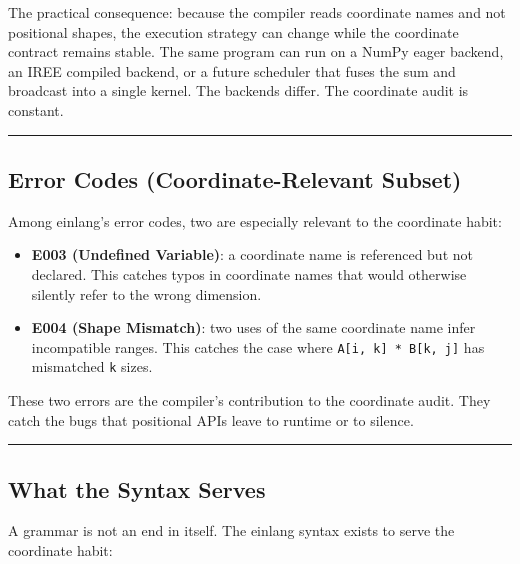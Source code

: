 \documentclass[11pt,]{article}
\providecommand{\tightlist}{%
  \setlength{\itemsep}{0pt}\setlength{\parskip}{0pt}}
\begin{document}
The practical consequence: because the compiler reads coordinate names
and not positional shapes, the execution strategy can change while the
coordinate contract remains stable. The same program can run on a NumPy
eager backend, an IREE compiled backend, or a future scheduler that
fuses the sum and broadcast into a single kernel. The backends differ.
The coordinate audit is constant.

\begin{center}\rule{0.5\linewidth}{0.4pt}\end{center}

\hypertarget{error-codes-coordinate-relevant-subset}{%
\subsection{Error Codes (Coordinate-Relevant
Subset)}\label{error-codes-coordinate-relevant-subset}}

Among einlang's error codes, two are especially relevant to the
coordinate habit:

\begin{itemize}
\tightlist
\item
  \textbf{E003 (Undefined Variable)}: a coordinate name is referenced
  but not declared. This catches typos in coordinate names that would
  otherwise silently refer to the wrong dimension.
\item
  \textbf{E004 (Shape Mismatch)}: two uses of the same coordinate name
  infer incompatible ranges. This catches the case where
  \texttt{A{[}i,\ k{]}\ *\ B{[}k,\ j{]}} has mismatched \texttt{k}
  sizes.
\end{itemize}

These two errors are the compiler's contribution to the coordinate
audit. They catch the bugs that positional APIs leave to runtime or to
silence.

\begin{center}\rule{0.5\linewidth}{0.4pt}\end{center}

\hypertarget{what-the-syntax-serves}{%
\subsection{What the Syntax Serves}\label{what-the-syntax-serves}}

A grammar is not an end in itself. The einlang syntax exists to serve
the coordinate habit:
\end{document}
